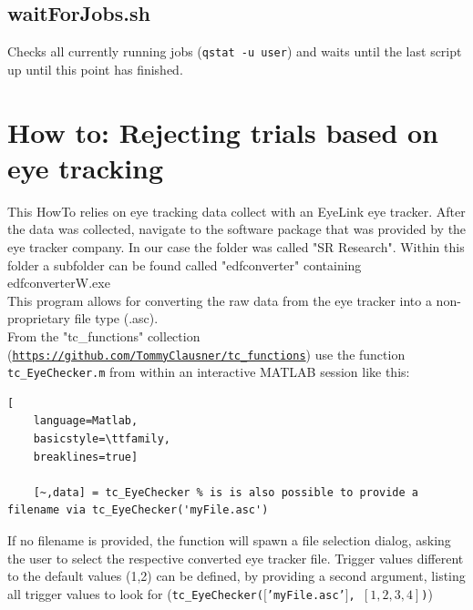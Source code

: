 \documentclass[12pt,a4paper]{scrartcl}
\begin{document}
\subsection{waitForJobs.sh}
\label{sh:wait}
Checks all currently running jobs (\texttt{qstat -u user}) and waits until the last script up until this point has finished.\\

\section{How to: Rejecting trials based on eye tracking}
\label{sec:eye}
This HowTo relies on eye tracking data collect with an EyeLink eye tracker. After the data was collected, navigate to the software package that was provided by the eye tracker company. In our case the folder was called "SR Research". Within this folder a subfolder can be found called "edfconverter" containing edfconverterW.exe\\

\noindent This program allows for converting the raw data from the eye tracker into a non-proprietary file type (.asc).\\

From the "tc\_functions" collection (\href{https://github.com/TommyClausner/tc_functions}{\nolinkurl{https://github.com/TommyClausner/tc_functions}}) use the function \texttt{tc\_EyeChecker.m} from within an interactive MATLAB session like this:
\begin{lstlisting}[
    language=Matlab,
    basicstyle=\ttfamily,
    breaklines=true]

    [~,data] = tc_EyeChecker % is is also possible to provide a filename via tc_EyeChecker('myFile.asc')
\end{lstlisting}
If no filename is provided, the function will spawn a file selection dialog, asking the user to select the respective converted eye tracker file. Trigger values different to the default values (1,2) can be defined, by providing a second argument, listing all trigger values to look for (\texttt{tc\_EyeChecker($[$'myFile.asc'$]$, $[1,2,3,4]$)})\\
\end{document}
